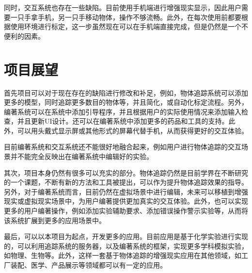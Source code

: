 同时，交互系统也存在一些缺陷。目前使用手机端进行增强现实显示，因此用户需要一只手拿手机，另一只手移动物体，操作不够流畅。此外，在每次使用前都要根据使用环境进行标定，这一步虽然现在可以在手机端直接完成，但是仍然是一个不便利的因素。

\section{项目展望}
首先项目可以对于现在存在的缺陷进行修改和补足，例如，物体追踪系统可以添加更多的模型，同时追踪更多数目的物体等，并且简化，或自动化标定流程。另外，编著系统可以在系统中添加引导程序，并且根据用户的实际使用情况来添加输入检查，并且更新UI设计。还可以在编著系统中添加更多的药品和工具的支持。此外，可以用头戴式显示屏或其他形式的屏幕代替手机，从而获得更好的交互体验。

目前编著系统和交互系统还不能很好地融合起来，例如用户进行物体追踪的交互场景并不能完全反映出在编著系统中编辑好的实验。

其次，项目本身仍然有很多可以充实的部分。物体追踪仍然是目前学界在不断研究的一个课题，不断有新的方法和工具被提出，可以作为提升物体追踪效果的指导。另外，对于编著系统而言，目前仍然在虚拟场景中进行编辑，未来可以移植到增强现实或虚拟现实场景中，为用户编著提供更加真实的交互体验。此外，也可以实现更多的用户编著操作，例如添加实验辅助要求、添加错误操作警示实验等，从而将该系统扩展到更多的应用场景中。

最后，可以以本项目为起点，开发更多的应用。目前应用是基于化学实验进行实现的，可以利用追踪系统的服务器，以及编著系统的框架，实现更多学科模拟实验，如物理、生物等。此外，这样一套基于物体追踪的增强现实应用在其他领域，如工厂装配、医学、产品展示等领域都可以有一定的应用。